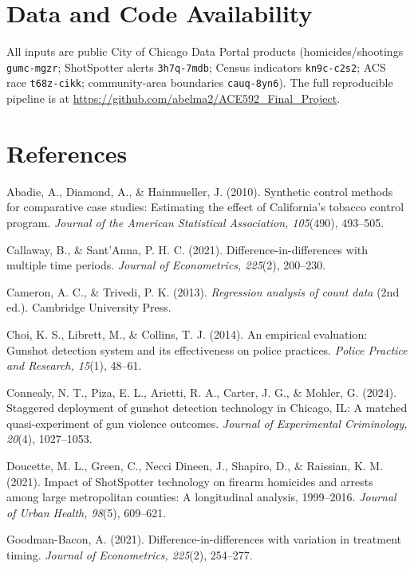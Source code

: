 \documentclass[12pt]{article}
\begin{document}
\section*{Data and Code Availability}

All inputs are public City of Chicago Data Portal products (homicides/shootings
\texttt{gumc-mgzr}; ShotSpotter alerts \texttt{3h7q-7mdb}; Census indicators
\texttt{kn9c-c2s2}; ACS race \texttt{t68z-cikk}; community-area boundaries
\texttt{cauq-8yn6}). The full reproducible pipeline is at
\url{https://github.com/abelma2/ACE592_Final_Project}.

\section*{References}
\begin{flushleft}
\setlength{\parindent}{-0.4in}
\leftskip=0.4in

Abadie, A., Diamond, A., \& Hainmueller, J. (2010). Synthetic control methods for
comparative case studies: Estimating the effect of California's tobacco control program.
\emph{Journal of the American Statistical Association, 105}(490), 493--505.

Callaway, B., \& Sant'Anna, P. H. C. (2021). Difference-in-differences with multiple time
periods. \emph{Journal of Econometrics, 225}(2), 200--230.

Cameron, A. C., \& Trivedi, P. K. (2013). \emph{Regression analysis of count data} (2nd
ed.). Cambridge University Press.

Choi, K. S., Librett, M., \& Collins, T. J. (2014). An empirical evaluation: Gunshot
detection system and its effectiveness on police practices. \emph{Police Practice and
Research, 15}(1), 48--61.

Connealy, N. T., Piza, E. L., Arietti, R. A., Carter, J. G., \& Mohler, G. (2024).
Staggered deployment of gunshot detection technology in Chicago, IL: A matched
quasi-experiment of gun violence outcomes. \emph{Journal of Experimental Criminology,
20}(4), 1027--1053.

Doucette, M. L., Green, C., Necci Dineen, J., Shapiro, D., \& Raissian, K. M. (2021).
Impact of ShotSpotter technology on firearm homicides and arrests among large
metropolitan counties: A longitudinal analysis, 1999--2016. \emph{Journal of Urban
Health, 98}(5), 609--621.

Goodman-Bacon, A. (2021). Difference-in-differences with variation in treatment timing.
\emph{Journal of Econometrics, 225}(2), 254--277.


\end{flushleft}
\end{document}
